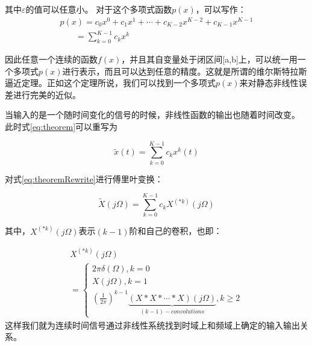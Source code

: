 		其中$\varepsilon $的值可以任意小。
		对于这个多项式函数$p(x)$，可以写作：
			\begin{equation}
				\begin{array}{l}
	p\left( x \right) = {c_0}{x^0} + {c_1}{x^1} +  \cdots  + {c_{K - 2}}{x^{K - 2}} + {c_{K - 1}}{x^{K - 1}}\\
	\,\,\,\,\,\,\,\,\,\,\, = \sum\limits_{k = 0}^{K - 1} {{c_k}{x^k}} 
	\end{array} \label{eq:theorem}
			\end{equation}
			
		因此任意一个连续的函数$f(x)$，并且其自变量处于闭区间[a,b]上，可以统一用一个多项式$p(x)$进行表示，而且可以达到任意的精度。这就是所谓的维尔斯特拉斯逼近定理。正如这个定理所说，我们可以找到一个多项式$p(x)$来对静态非线性误差进行完美的近似。\par
		当输入的是一个随时间变化的信号的时候，非线性函数的输出也随着时间改变。
		此时式\ref{eq:theorem}可以重写为
			
			\begin{equation}
				\tilde x\left( t \right) = \sum\limits_{k = 0}^{K - 1} {{c_k}{x^k}\left( t \right)}  \label{eq:theoremRewrite}
			\end{equation}
			
		对式\ref{eq:theoremRewrite}进行傅里叶变换：
			
			\begin{equation}
				\tilde X\left( {j\Omega } \right) = \sum\limits_{k = 0}^{K - 1} {{c_k}{X^{\left( {*k} \right)}}\left( {j\Omega } \right)} 
			\end{equation}
			
		其中，${X^{\left( {*k} \right)}}\left( {j\Omega } \right)$表示$(k-1)$阶和自己的卷积，也即：
		
			\begin{equation}
				\begin{array}{l}
	{X^{\left( {*k} \right)}}\left( {j\Omega } \right)\\
	 = \left\{ \begin{array}{l}
	2\pi \delta \left( \Omega  \right),k = 0\\
	X\left( {j\Omega } \right),k = 1\\
	{\left( {\frac{1}{{2\pi }}} \right)^{k - 1}}\underbrace {\left( {X*X* \cdots *X} \right)\left( {j\Omega } \right)}_{\left( {k - 1} \right) - convolutions},k \ge 2
	\end{array} \right.
	\end{array}
			\end{equation}
		这样我们就为连续时间信号通过非线性系统找到时域上和频域上确定的输入输出关系。
